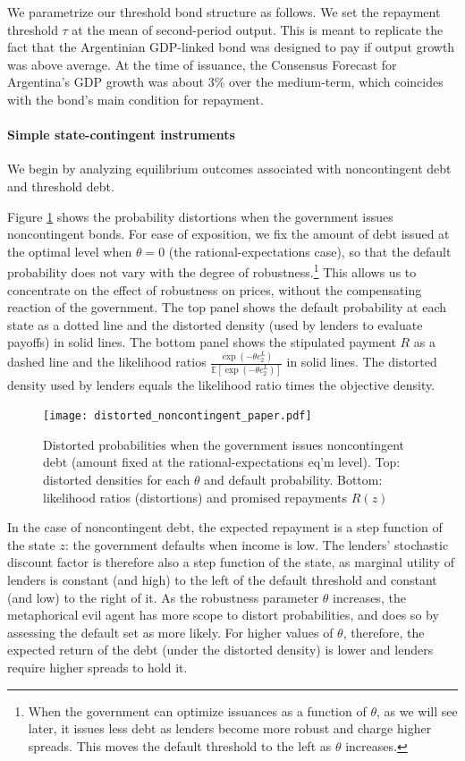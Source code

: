We parametrize our threshold bond structure as follows. We set the repayment threshold $\tau$ at the mean of second-period output. This is meant to replicate the fact that the Argentinian GDP-linked bond was designed to pay if output growth was above average. At the time of issuance, the Consensus Forecast for Argentina's GDP growth was about 3\% over the medium-term, which coincides with the bond's main condition for repayment.

\paragraph{Simple state-contingent instruments}
We begin by analyzing equilibrium outcomes associated with noncontingent debt and threshold debt.

Figure \ref{Figure_distorted_noncontingent} shows the probability distortions when the government issues noncontingent bonds. For ease of exposition, we fix the amount of debt issued at the optimal level when $\theta = 0$ (the rational-expectations case), so that the default probability does not vary with the degree of robustness.\footnote{When the government can optimize issuances as a function of $\theta$, as we will see later, it issues less debt as lenders become more robust and charge higher spreads. This moves the default threshold to the left as $\theta$ increases.} This allows us to concentrate on the effect of robustness on prices, without the compensating reaction of the government. The top panel shows the default probability at each state as a dotted line and the distorted density (used by lenders to evaluate payoffs) in solid lines. The bottom panel shows the stipulated payment $R$ as a dashed line and the likelihood ratios $\frac{\exp(-\theta c_2^L)}{\mathbb{E}\left[\exp(-\theta c_2^L)\right]}$ in solid lines. The distorted density used by lenders equals the likelihood ratio times the objective density.
\begin{figure}[!hbtp]\centering
    \texttt{[image: distorted\_noncontingent\_paper.pdf]}
\caption{Distorted probabilities when the government issues noncontingent debt (amount fixed at the rational-expectations eq'm level). Top: distorted densities for each $\theta$ and default probability. Bottom: likelihood ratios (distortions) and promised repayments $R(z)$
\label{Figure_distorted_noncontingent}}
\end{figure}

In the case of noncontingent debt, the expected repayment is a step function of the state $z$: the government defaults when income is low. The lenders' stochastic discount factor is therefore also a step function of the state, as marginal utility of lenders is constant (and high) to the left of the default threshold and constant (and low) to the right of it. As the robustness parameter $\theta$ increases, the metaphorical evil agent has more scope to distort probabilities, and does so by assessing the default set as more likely. For higher values of $\theta$, therefore, the expected return of the debt (under the distorted density) is lower and lenders require higher spreads to hold it.
  
